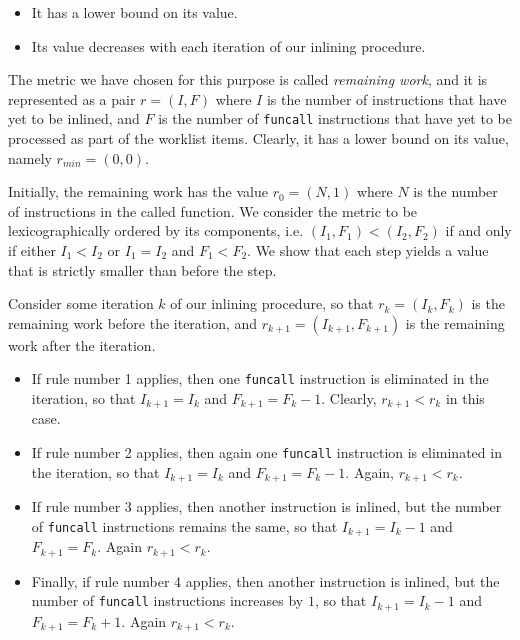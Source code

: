 \begin{itemize}
\item It has a lower bound on its value.
\item Its value decreases with each iteration of our inlining
  procedure.
\end{itemize}

The metric we have chosen for this purpose is called \emph{remaining
  work}, and it is represented as a pair $r = (I,F)$ where $I$ is the
number of instructions that have yet to be inlined, and $F$ is the
number of \texttt{funcall} instructions that have yet to be processed
as part of the worklist items.  Clearly, it has a lower bound on its
value, namely $r_{min} = (0,0)$.

Initially, the remaining work has the value $r_0 = (N,1)$ where $N$ is
the number of instructions in the called function.  We consider the
metric to be lexicographically ordered by its components, i.e. $(I_1,
F_1) < (I_2, F_2)$ if and only if either $I_1 < I_2$ or $I_1 = I_2$
and $F_1 < F_2$.  We show that each step yields a value that is
strictly smaller than before the step.

Consider some iteration $k$ of our inlining procedure, so that $r_k =
(I_k,F_k)$ is the remaining work before the iteration, and $r_{k+1} =
(I_{k+1},F_{k+1})$ is the remaining work after the iteration.

\begin{itemize}
\item If rule number 1 applies, then one \texttt{funcall} instruction
  is eliminated in the iteration, so that $I_{k+1} = I_k$ and $F_{k+1}
  = F_k-1$.  Clearly, $r_{k+1} < r_k$ in this case.
\item If rule number 2 applies, then again one \texttt{funcall}
  instruction is eliminated in the iteration, so that $I_{k+1} = I_k$
  and $F_{k+1} = F_k-1$.  Again, $r_{k+1} < r_k$.
\item If rule number 3 applies, then another instruction is inlined,
  but the number of \texttt{funcall} instructions remains the same, so
  that $I_{k+1} = I_k-1$ and $F_{k+1} = F_k$.  Again $r_{k+1} < r_k$.
\item Finally, if rule number 4 applies, then another instruction is inlined,
  but the number of \texttt{funcall} instructions increases by $1$, so
  that $I_{k+1} = I_k-1$ and $F_{k+1} = F_k+1$.  Again $r_{k+1} < r_k$.
\end{itemize}

